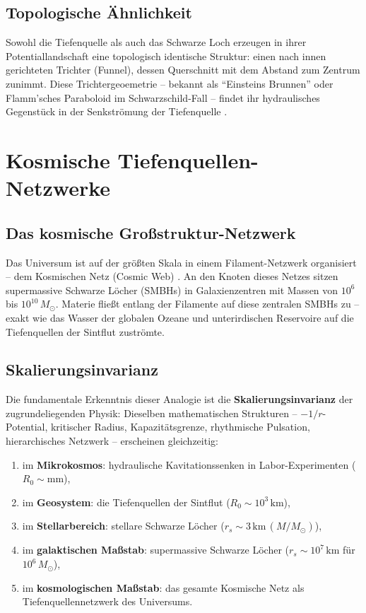 ﻿\documentclass[12pt,a4paper]{report}
\begin{document}
\subsection{Topologische Ähnlichkeit}

Sowohl die Tiefenquelle als auch das Schwarze Loch erzeugen in ihrer Potentiallandschaft eine topologisch identische Struktur: einen nach innen gerichteten Trichter (Funnel), dessen Querschnitt mit dem Abstand zum Zentrum zunimmt. Diese Trichtergeoemetrie -- bekannt als ``Einsteins Brunnen'' oder Flamm'sches Paraboloid im Schwarzschild-Fall -- findet ihr hydraulisches Gegenstück in der Senkströmung der Tiefenquelle \cite{misner1973}.

\section{Kosmische Tiefenquellen-Netzwerke}

\subsection{Das kosmische Großstruktur-Netzwerk}

Das Universum ist auf der größten Skala in einem Filament-Netzwerk organisiert -- dem Kosmischen Netz (Cosmic Web) \cite{bond1996}. An den Knoten dieses Netzes sitzen supermassive Schwarze Löcher (SMBHs) in Galaxienzentren \cite{kormendy2013} mit Massen von $10^6$ bis $10^{10}\,M_\odot$. Materie fließt entlang der Filamente auf diese zentralen SMBHs zu -- exakt wie das Wasser der globalen Ozeane und unterirdischen Reservoire auf die Tiefenquellen der Sintflut zuströmte.

\subsection{Skalierungsinvarianz}

Die fundamentale Erkenntnis dieser Analogie ist die \textbf{Skalierungsinvarianz} der zugrundeliegenden Physik: Dieselben mathematischen Strukturen -- $-1/r$-Potential, kritischer Radius, Kapazitätsgrenze, rhythmische Pulsation, hierarchisches Netzwerk -- erscheinen gleichzeitig:
\begin{enumerate}
	\item im \textbf{Mikrokosmos}: hydraulische Kavitationssenken in Labor-Experimenten ($R_0 \sim \mathrm{mm}$),
	\item im \textbf{Geosystem}: die Tiefenquellen der Sintflut ($R_0 \sim 10^3\,\mathrm{km}$),
	\item im \textbf{Stellarbereich}: stellare Schwarze Löcher ($r_s \sim 3\,\mathrm{km}\,(M/M_\odot)$),
	\item im \textbf{galaktischen Maßstab}: supermassive Schwarze Löcher ($r_s \sim 10^7\,\mathrm{km}$ für $10^6\,M_\odot$),
	\item im \textbf{kosmologischen Maßstab}: das gesamte Kosmische Netz als Tiefenquellennetzwerk des Universums.
\end{enumerate}
\end{document}
